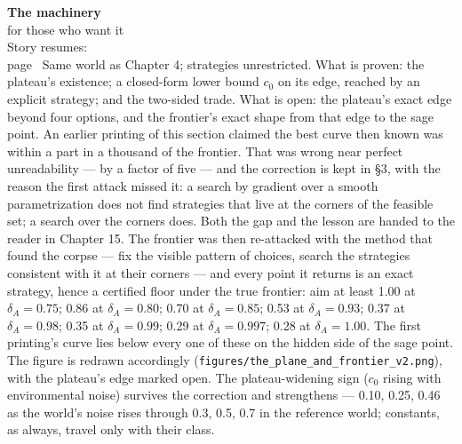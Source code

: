 \begin{machinery}{\textbf{The machinery}\\for those who want it\\[3pt]{\color{muted}Story resumes:\\page~\pageref{ch7}}}
Same world as Chapter 4; strategies unrestricted. What is proven: the
plateau's existence; a closed-form lower bound \(c_0\) on its edge, reached
by an explicit strategy; and the two-sided trade. What is
open: the plateau's exact edge beyond four options, and the
frontier's exact shape from that edge to the sage point. An earlier
printing of this section claimed the best curve then known was within a part in a
thousand of the frontier. That was wrong near perfect unreadability ---
by a factor of five --- and the correction is kept in §3, with the
reason the first attack missed it: a search by gradient over a smooth
parametrization does not find strategies that live at the corners of
the feasible set; a search over the corners does. Both the gap and the
lesson are handed to the reader in Chapter 15. The frontier was then
re-attacked with the method that found the corpse --- fix the visible
pattern of choices, search the strategies consistent with it at their
corners --- and every point it returns is an exact strategy, hence a
certified floor under the true frontier: aim at least 1.00 at \(\delta_A = 0.75\); 0.86 at \(\delta_A = 0.80\); 0.70 at \(\delta_A = 0.85\); 0.53 at \(\delta_A = 0.93\); 0.37 at \(\delta_A = 0.98\); 0.35 at \(\delta_A = 0.99\); 0.29 at \(\delta_A = 0.997\); 0.28 at \(\delta_A = 1.00\). The first
printing's curve lies below every one of these on the hidden side of
the sage point. The figure is redrawn accordingly (\texttt{figures/\allowbreak{}the\_\allowbreak{}plane\_\allowbreak{}and\_\allowbreak{}frontier\_\allowbreak{}v2.\allowbreak{}png}), with the plateau's edge marked open. The plateau-widening
sign (\(c_0\) rising with environmental noise) survives the correction and
strengthens --- 0.10, 0.25, 0.46 as the world's noise rises through 0.3,
0.5, 0.7 in the reference world; constants, as always, travel only with
their class.

\end{machinery}

